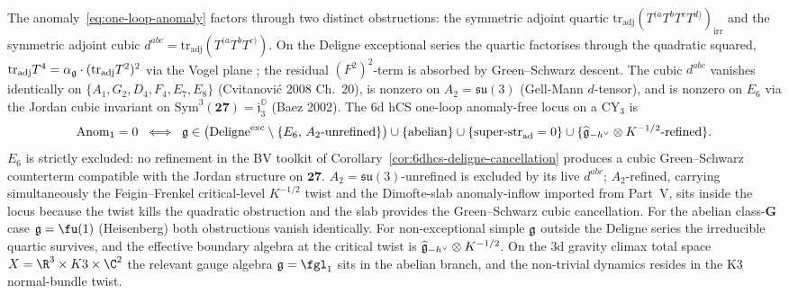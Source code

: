 \begin{remark}
\label{rem:hcs-anomaly-locus}
The anomaly~\eqref{eq:one-loop-anomaly} factors through two distinct
obstructions: the symmetric adjoint quartic
$\mathrm{tr}_{\mathrm{adj}}(T^{(a}T^{b}T^{c}T^{d)})_{\mathrm{irr}}$
and the symmetric adjoint cubic
$d^{abc}=\mathrm{tr}_{\mathrm{adj}}(T^{(a}T^{b}T^{c)})$. On the
Deligne exceptional series the quartic factorises through the
quadratic squared,
$\mathrm{tr}_{\mathrm{adj}}T^{4} = \alpha_{\mathfrak{g}}\cdot
(\mathrm{tr}_{\mathrm{adj}}T^{2})^{2}$ via the Vogel plane
\cite{Deligne1996,Costello2017M5,CostelloLi2016}; the residual
$(F^{2})^{2}$-term is absorbed by Green--Schwarz descent. The cubic
$d^{abc}$ vanishes identically on $\{A_{1},G_{2},D_{4},F_{4},E_{7},E_{8}\}$
(Cvitanović 2008 Ch.~20), is nonzero on $A_{2}=\mathfrak{su}(3)$
(Gell-Mann $d$-tensor), and is nonzero on $E_{6}$ via the Jordan
cubic invariant on $\mathrm{Sym}^{3}(\mathbf{27})=\mathfrak j_{3}^{\mathbb O}$
(Baez 2002). The 6d hCS one-loop anomaly-free locus on a CY$_{3}$ is
\begin{equation}\label{eq:hcs-anom-locus}
\mathrm{Anom}_{1}=0\;\iff\;
\mathfrak{g}\in\bigl(\mathrm{Deligne}^{\mathrm{exc}}\setminus
\{E_{6},\,A_{2}\text{-unrefined}\}\bigr)
\cup\{\mathrm{abelian}\}
\cup\{\mathrm{super\text{-}str}_{\mathrm{ad}}=0\}
\cup\{\widehat{\mathfrak{g}}_{-h^{\vee}}\otimes K^{-1/2}\text{-refined}\}.
\end{equation}
$E_{6}$ is strictly excluded: no refinement in the BV toolkit of
Corollary~\ref{cor:6dhcs-deligne-cancellation} produces a cubic
Green--Schwarz counterterm compatible with the Jordan structure on
$\mathbf{27}$. $A_{2}=\mathfrak{su}(3)$-unrefined is excluded by its
live $d^{abc}$; $A_{2}$-refined, carrying simultaneously the
Feigin--Frenkel critical-level $K^{-1/2}$ twist and the
Dimofte-slab anomaly-inflow imported from Part~V, sits inside the
locus because the twist kills the quadratic obstruction and the
slab provides the Green--Schwarz cubic cancellation. For the
abelian class-$\mathbf G$ case $\fg=\fu(1)$ (Heisenberg) both
obstructions vanish identically. For non-exceptional simple $\mathfrak{g}$
outside the Deligne series the irreducible quartic survives, and
the effective boundary algebra at the critical twist is
$\widehat{\mathfrak{g}}_{-h^{\vee}}\otimes K^{-1/2}$. On the 3d gravity
climax total space $X = \R^{3}\times K3\times\C^{2}$ the relevant
gauge algebra $\fg = \fgl_{1}$ sits in the abelian branch, and the
non-trivial dynamics resides in the K3 normal-bundle twist.
\end{remark}

